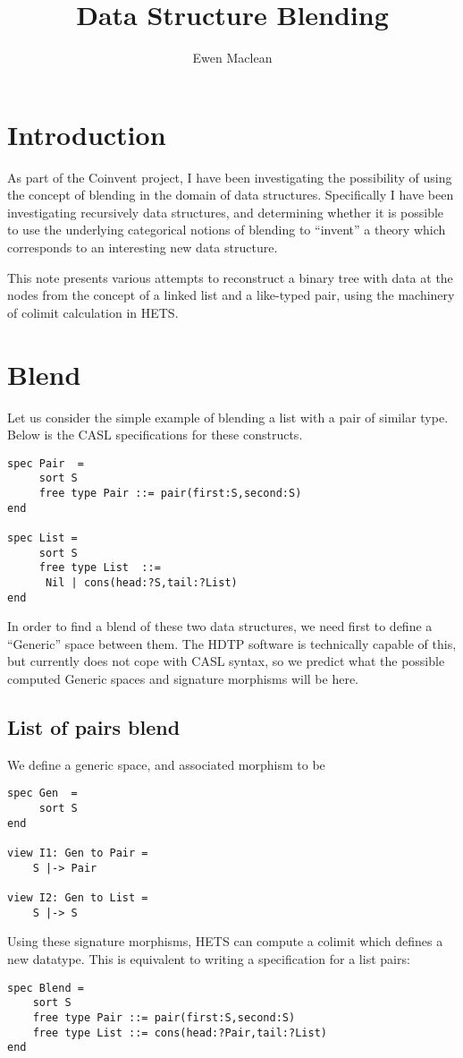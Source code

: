 \documentclass{blue-book}
\title{Data Structure Blending}
\author{Ewen Maclean}
\begin{document}
\maketitle

\section{Introduction}

As part of the Coinvent project, I have been investigating the possibility of using the concept of blending in the domain of data structures. Specifically I have been investigating recursively data structures, and determining whether it is possible to use the underlying categorical notions of blending to ``invent'' a theory which corresponds to an interesting new data structure.

This note presents various attempts to reconstruct a binary tree with data at the nodes from the concept of a linked list and a like-typed pair, using the machinery of colimit calculation in HETS.

\section{Blend}

Let us consider the simple example of blending a list with a pair of similar type. Below is the CASL specifications for these constructs. 
\begin{verbatim}
spec Pair  = 
     sort S
     free type Pair ::= pair(first:S,second:S)
end

spec List =
     sort S
     free type List  ::=
	  Nil | cons(head:?S,tail:?List)
end
\end{verbatim}
\noindent In order to find a blend of these two data structures, we need first to define a ``Generic'' space between them. The HDTP software is technically capable of this, but currently does not cope with CASL syntax, so we predict what the possible computed Generic spaces and signature morphisms will be here.

\subsection{List of pairs blend}

We define a generic space, and associated morphism to be
\begin{verbatim}
spec Gen  = 
     sort S
end

view I1: Gen to Pair = 
    S |-> Pair

view I2: Gen to List =
    S |-> S
\end{verbatim}
\noindent Using these signature morphisms, HETS can compute a colimit which defines a new datatype. This is equivalent to writing a specification for a list pairs:
\begin{verbatim}
spec Blend = 
    sort S
    free type Pair ::= pair(first:S,second:S)
    free type List ::= cons(head:?Pair,tail:?List)
end
\end{verbatim}
\end{document}
